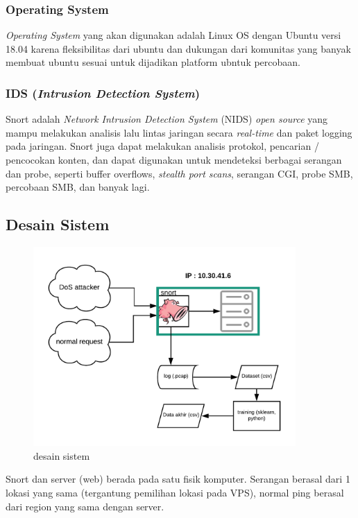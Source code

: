 \subsubsection{Operating System}

\textit{Operating System} yang akan digunakan adalah Linux OS dengan Ubuntu versi 18.04 karena fleksibilitas dari ubuntu dan dukungan dari komunitas yang banyak membuat ubuntu sesuai untuk dijadikan platform ubntuk percobaan.

\subsubsection{IDS (\textit{Intrusion Detection System})}
Snort adalah \textit{Network Intrusion Detection System} (NIDS) \textit{open source} yang mampu melakukan analisis lalu lintas jaringan secara \textit{real-time} dan paket logging pada jaringan. Snort juga dapat melakukan analisis protokol, pencarian / pencocokan konten, dan dapat digunakan untuk mendeteksi berbagai serangan dan probe, seperti buffer overflows, \textit{stealth port scans}, serangan CGI, probe SMB, percobaan SMB, dan banyak lagi.

\subsection{Desain Sistem}

\begin{figure}[H]
\centering
\includegraphics[width=10cm]{tugas akhir.png}
\caption{desain sistem}
\end{figure}

Snort dan server (web) berada pada satu fisik komputer. Serangan berasal dari 1 lokasi yang sama (tergantung pemilihan lokasi pada VPS), normal ping berasal dari region yang sama dengan server.

